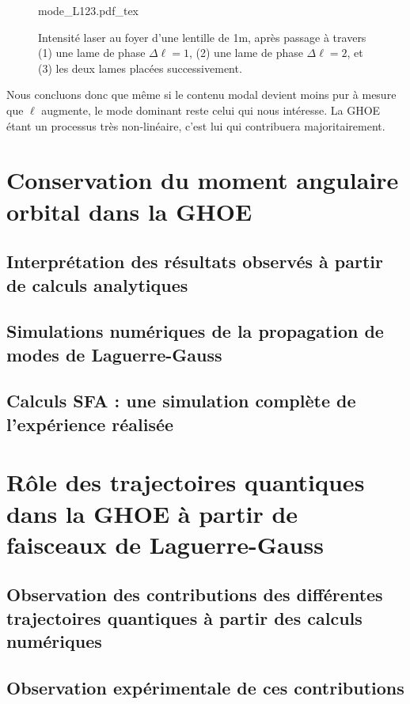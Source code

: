 \begin{figure}[!ht]
\centering
\def\svgwidth{\columnwidth}
{mode_L123.pdf_tex}
\caption{Intensité laser au foyer d'une lentille de 1m, après passage à travers (1) une lame de phase $\Delta\ell = 1$, (2) une lame de phase $\Delta\ell = 2$, et (3) les deux lames placées successivement.}
\label{Fig:DecompIR}
\end{figure}

Nous concluons donc que même si le contenu modal devient moins pur à mesure que $\ell$ augmente, le mode dominant reste celui qui nous intéresse. La GHOE étant un processus très non-linéaire, c'est lui qui contribuera majoritairement. 








\section{Conservation du moment angulaire orbital dans la GHOE}
\subsection{Interprétation des résultats observés à partir de calculs analytiques}
\subsection{Simulations numériques de la propagation de modes de Laguerre-Gauss}
\subsection{Calculs SFA : une simulation complète de l'expérience réalisée}

\section{Rôle des trajectoires quantiques dans la GHOE à partir de faisceaux de Laguerre-Gauss}
\subsection{Observation des contributions des différentes trajectoires quantiques à partir des calculs numériques}
\subsection{Observation expérimentale de ces contributions}
